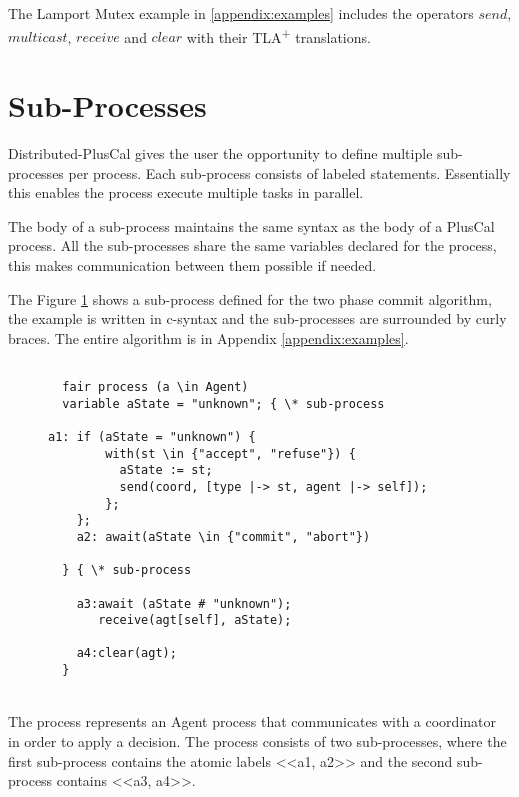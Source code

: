\documentclass{thesul}
\newcommand{\tlaplus}{TLA\textsuperscript{+}\xspace}
\begin{document}
The Lamport Mutex example in \ref{appendix:examples} includes the operators $send$, $multicast$, $receive$ and $clear$ with their \tlaplus translations.

\section{Sub-Processes}
\label{subProcess}

Distributed-PlusCal gives the user the opportunity to define multiple sub-processes per process. Each sub-process consists of labeled statements. Essentially this enables the process execute multiple tasks in parallel.

The body of a sub-process maintains the same syntax as the body of a PlusCal process. All the sub-processes share the same variables declared for the process, this makes communication between them possible if needed.

The Figure \ref{2pcSub} shows a sub-process defined for the two phase commit algorithm, the example is written in c-syntax and the sub-processes are surrounded by curly braces.
The entire algorithm is in Appendix \ref{appendix:examples}.

\begin{figure}[!h]
\label{2pcSub}
\begin{lstlisting}[caption = Distributed-PlusCal Sub-Processes, frame = tlrb, firstnumber = 1]
   
  fair process (a \in Agent)
  variable aState = "unknown"; { \* sub-process

a1: if (aState = "unknown") {
        with(st \in {"accept", "refuse"}) {
          aState := st;
          send(coord, [type |-> st, agent |-> self]);
        };
    };
    a2: await(aState \in {"commit", "abort"})
    
  } { \* sub-process
    
    a3:await (aState # "unknown");
       receive(agt[self], aState); 
       
    a4:clear(agt);
  }

\end{lstlisting}
\end{figure}

\hfill\\

The process represents an Agent process that communicates with a coordinator in order to apply a decision. The process consists of two sub-processes, where the first sub-process contains the atomic labels <<a1, a2>> and the second sub-process contains <<a3, a4>>.
\end{document}
